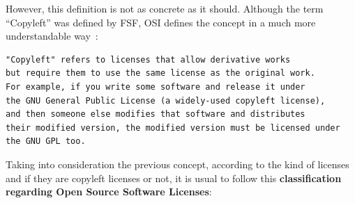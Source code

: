 \documentclass[a4paper, 12pt]{book}
\begin{document}
However, this definition is not as concrete as it should. Although the term ``Copyleft'' was defined by FSF, OSI defines the concept in a much more understandable way~\cite{OSICopyleft}:
\begin{verbatim}
"Copyleft" refers to licenses that allow derivative works
but require them to use the same license as the original work.
For example, if you write some software and release it under
the GNU General Public License (a widely-used copyleft license),
and then someone else modifies that software and distributes
their modified version, the modified version must be licensed under
the GNU GPL too.
\end{verbatim}
Taking into consideration the previous concept, according to the kind of licenses and if they are copyleft licenses or not, it is usual to follow this \textbf{classification regarding Open Source Software Licenses}:
\end{document}
